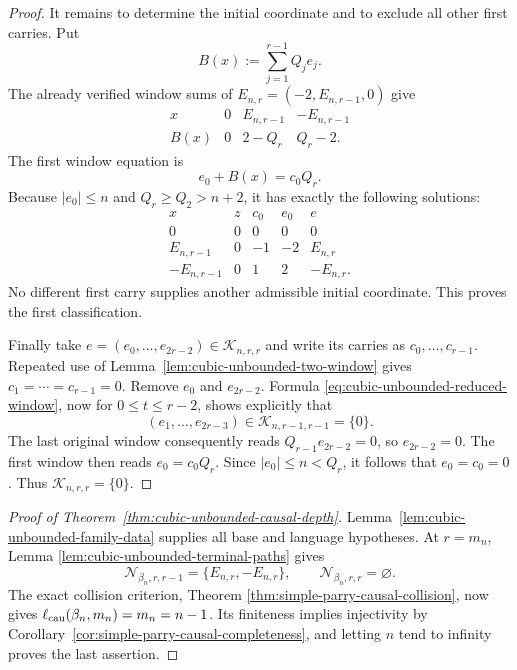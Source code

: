 \begin{proof}
It remains to determine the initial coordinate and to exclude all other
first carries.  Put
\[
B(x):=\sum_{j=1}^{r-1}Q_je_j.
\]
The already verified window sums of
$E_{n,r}=(-2,E_{n,r-1},0)$ give
\[
\begin{array}{c|ccc}
x&0&E_{n,r-1}&-E_{n,r-1}\\ \hline
B(x)&0&2-Q_r&Q_r-2.
\end{array}
\]
The first window equation is
\begin{equation}
e_0+B(x)=c_0Q_r.
\label{eq:cubic-unbounded-first-coordinate}
\end{equation}
Because $|e_0|\le n$ and $Q_r\ge Q_2>n+2$, it has exactly the following
solutions:
\[
\begin{array}{c|c|c|c|c}
x&z&c_0&e_0&e\\ \hline
0&0&0&0&0\\
E_{n,r-1}&0&-1&-2&E_{n,r}\\
-E_{n,r-1}&0&1&2&-E_{n,r}.
\end{array}
\]
No different first carry supplies another admissible initial coordinate.
This proves the first classification.

Finally take
$e=(e_0,\ldots,e_{2r-2})\in\mathcal K_{n,r,r}$ and write its carries as
$c_0,\ldots,c_{r-1}$.  Repeated use of
Lemma~\ref{lem:cubic-unbounded-two-window} gives
$c_1=\cdots=c_{r-1}=0$.  Remove $e_0$ and $e_{2r-2}$.  Formula
\eqref{eq:cubic-unbounded-reduced-window}, now for
$0\le t\le r-2$, shows explicitly that
\[
(e_1,\ldots,e_{2r-3})\in\mathcal K_{n,r-1,r-1}=\{0\}.
\]
The last original window consequently reads
$Q_{r-1}e_{2r-2}=0$, so $e_{2r-2}=0$.  The first window then reads
$e_0=c_0Q_r$.  Since $|e_0|\le n<Q_r$, it follows that
$e_0=c_0=0$.  Thus $\mathcal K_{n,r,r}=\{0\}$.
\end{proof}

\begin{proof}[Proof of Theorem~\ref{thm:cubic-unbounded-causal-depth}]
Lemma~\ref{lem:cubic-unbounded-family-data} supplies all base and language
hypotheses.  At $r=m_n$, Lemma
\ref{lem:cubic-unbounded-terminal-paths} gives
\[
\mathcal N_{\beta_n,r,r-1}=\{E_{n,r},-E_{n,r}\},
\qquad
\mathcal N_{\beta_n,r,r}=\varnothing.
\]
The exact collision criterion, Theorem
\ref{thm:simple-parry-causal-collision}, now gives
$\ell_{\rm cau}(\beta_n,m_n)=m_n=n-1$.  Its finiteness implies
injectivity by Corollary~\ref{cor:simple-parry-causal-completeness}, and
letting $n$ tend to infinity proves the last assertion.
\end{proof}
